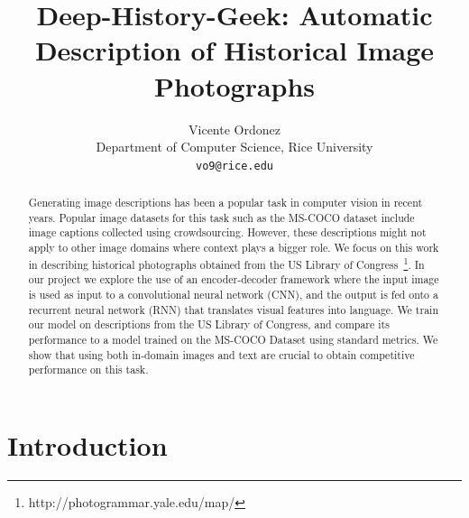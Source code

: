 \documentclass[10pt,twocolumn,letterpaper]{article}
\begin{document}
\title{Deep-History-Geek: Automatic Description of Historical Image Photographs}

\author{Vicente Ordonez\\
Department of Computer Science, Rice University\\
{\tt\small vo9@rice.edu}
}

\maketitle

\begin{abstract}
   Generating image descriptions has been a popular task in computer vision in recent years.
   Popular image datasets for this task such as the MS-COCO dataset include image captions 
   collected using crowdsourcing. However, these descriptions might not apply to other image domains
   where context plays a bigger role. We focus on this work in describing historical photographs obtained
   from the US Library of Congress~\footnote{http://photogrammar.yale.edu/map/}. In our project we explore the use of an encoder-decoder framework
   where the input image is used as input to a convolutional neural network (CNN), and the output is fed
   onto a recurrent neural network (RNN) that translates visual features into language. We train our model
   on descriptions from the US Library of Congress, and compare its performance to a model trained on the
   MS-COCO Dataset using standard metrics. We show that using both in-domain images and text are crucial
   to obtain competitive performance on this task.
\end{abstract}




\section{Introduction}
\end{document}
